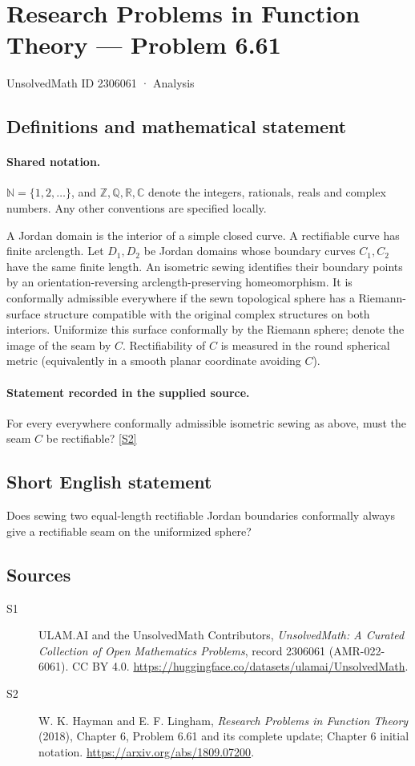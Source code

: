 \documentclass[11pt]{article}
\newcommand{\sref}[2]{\hyperlink{source:#1:#2}{[S#2]}}
\begin{document}
\setcounter{section}{2306060}
\section{Research Problems in Function Theory — Problem 6.61}\label{2306061}
{\small\sffamily UnsolvedMath ID 2306061 · Analysis}
\subsection{Definitions and mathematical statement}

\paragraph{Shared notation.}$\mathbb N=\{1,2,\ldots\}$, and $\mathbb Z,\mathbb Q,\mathbb R,\mathbb C$ denote the integers, rationals, reals and complex numbers. Any other conventions are specified locally.


A Jordan domain is the interior of a simple closed curve. A rectifiable curve has finite arclength. Let $D_1,D_2$ be Jordan domains whose boundary curves $C_1,C_2$ have the same finite length. An isometric sewing identifies their boundary points by an orientation-reversing arclength-preserving homeomorphism. It is conformally admissible everywhere if the sewn topological sphere has a Riemann-surface structure compatible with the original complex structures on both interiors. Uniformize this surface conformally by the Riemann sphere; denote the image of the seam by $C$. Rectifiability of $C$ is measured in the round spherical metric (equivalently in a smooth planar coordinate avoiding $C$).
\paragraph{Statement recorded in the supplied source.}
For every everywhere conformally admissible isometric sewing as above, must the seam $C$ be rectifiable? \sref{2306061}{2}
\subsection{Short English statement}
Does sewing two equal-length rectifiable Jordan boundaries conformally always give a rectifiable seam on the uniformized sphere?
\subsection{Sources}
\begin{description}
\item[\hypertarget{source:2306061:1}{S1}] ULAM.AI and the UnsolvedMath Contributors, \emph{UnsolvedMath: A Curated Collection of Open Mathematics Problems}, record 2306061 (AMR-022-6061). CC BY 4.0. \url{https://huggingface.co/datasets/ulamai/UnsolvedMath}.
\item[\hypertarget{source:2306061:2}{S2}] W. K. Hayman and E. F. Lingham, \emph{Research Problems in Function Theory} (2018), Chapter 6, Problem 6.61 and its complete update; Chapter 6 initial notation. \url{https://arxiv.org/abs/1809.07200}.
\end{description}
\label{end:2306061}
\end{document}
